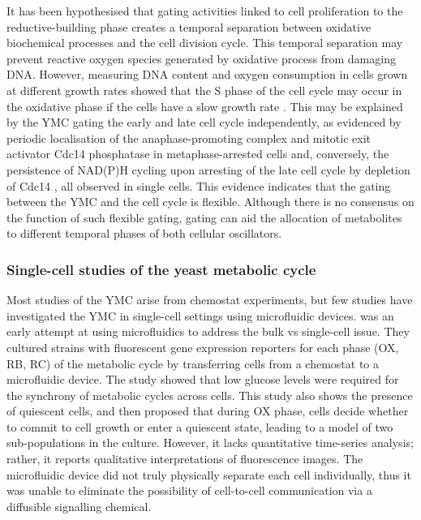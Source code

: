 It has been hypothesised that gating activities linked to cell proliferation to the reductive-building phase
creates a temporal separation between oxidative biochemical processes and the cell division cycle.
This temporal separation may prevent reactive oxygen species generated by oxidative process from damaging DNA\@.
However, measuring DNA content and oxygen consumption in cells grown at different growth rates showed that the S phase of the cell cycle may occur in the oxidative phase if the cells have a slow growth rate \parencite{slavovCouplingGrowthRate2011}.
This may be explained by the YMC gating the early and late cell cycle independently, as evidenced by periodic localisation of the anaphase-promoting complex and mitotic exit activator Cdc14 phosphatase in metaphase-arrested cells \parencite{luPeriodicCyclinCdkActivity2010} and, conversely, the persistence of NAD(P)H cycling upon arresting of the late cell cycle by depletion of Cdc14 \parencite{papagiannakisAutonomousMetabolicOscillations2017}, all observed in single cells.
This evidence indicates that the gating between the YMC and the cell cycle is flexible.
Although there is no consensus on the function of such flexible gating,
gating can aid the allocation of metabolites to different temporal phases of both cellular oscillators.


\subsubsection{Single-cell studies of the yeast metabolic cycle}
\label{subsubsec:intro-ymc-definition-singlecell}

Most studies of the YMC arise from chemostat experiments, but few studies have investigated the YMC in single-cell settings using microfluidic devices.
\textcite{laxmanBehaviorMetabolicCycling2010} was an early attempt at using microfluidics to address the bulk vs single-cell issue.
They cultured strains with fluorescent gene expression reporters for each phase (OX, RB, RC) of the metabolic cycle by transferring cells from a chemostat to a microfluidic device.
The study showed that low glucose levels were required for the synchrony of metabolic cycles across cells.
This study also shows the presence of quiescent cells, and then proposed that during OX phase, cells decide whether to commit to cell growth or enter a quiescent state, leading to a model of two sub-populations in the culture.
However, it lacks quantitative time-series analysis; rather, it reports qualitative interpretations of fluorescence images.
The microfluidic device did not truly physically separate each cell individually, thus it was unable to eliminate the possibility of cell-to-cell communication via a diffusible signalling chemical.

